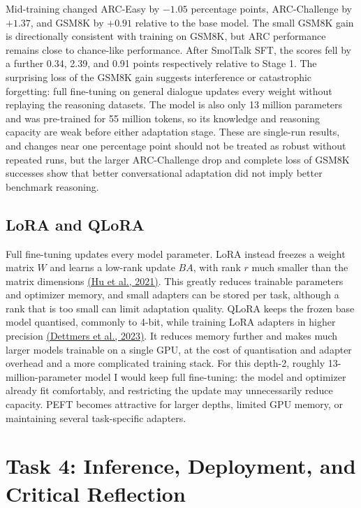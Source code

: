 \documentclass{article}
\begin{document}
Mid-training changed ARC-Easy by $-1.05$ percentage points, ARC-Challenge by
$+1.37$, and GSM8K by $+0.91$ relative to the base model. The small GSM8K gain
is directionally consistent with training on GSM8K, but ARC performance remains
close to chance-like performance. After SmolTalk SFT, the scores fell by a further
0.34, 2.39, and 0.91 points respectively relative to Stage 1. The surprising
loss of the GSM8K gain suggests interference or catastrophic forgetting: full
fine-tuning on general dialogue updates every weight without replaying the
reasoning datasets. The model is also only 13 million parameters and was
pre-trained for 55 million tokens, so its knowledge and reasoning capacity are
weak before either adaptation stage. These are single-run results, and changes
near one percentage point should not be treated as robust without repeated
runs, but the larger ARC-Challenge drop and complete loss of GSM8K successes
show that better conversational adaptation did not imply better benchmark
reasoning.

\subsection{LoRA and QLoRA}

Full fine-tuning updates every model parameter. LoRA instead freezes a weight
matrix $W$ and learns a low-rank update $BA$, with rank $r$ much smaller than
the matrix dimensions
\href{https://arxiv.org/abs/2106.09685}{(Hu et al., 2021)}. This greatly reduces
trainable parameters and optimizer memory, and small adapters can be stored per
task, although a rank that is too small can limit adaptation quality. QLoRA
keeps the frozen base model quantised, commonly to 4-bit, while training LoRA
adapters in higher precision
\href{https://arxiv.org/abs/2305.14314}{(Dettmers et al., 2023)}. It reduces
memory further and makes much larger models trainable on a single GPU, at the
cost of quantisation and adapter overhead and a more complicated training
stack. For this depth-2, roughly 13-million-parameter model I would keep full
fine-tuning: the model and optimizer already fit comfortably, and restricting
the update may unnecessarily reduce capacity. PEFT becomes attractive for
larger depths, limited GPU memory, or maintaining several task-specific
adapters.

\section{Task 4: Inference, Deployment, and Critical Reflection}
\end{document}
